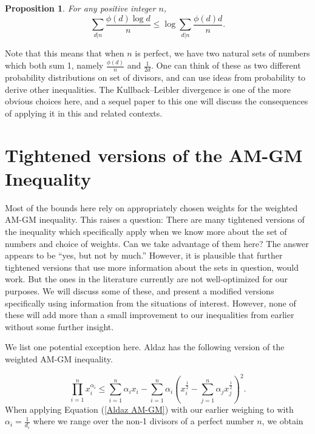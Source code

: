 \documentclass{article}
\newtheorem{proposition}[theorem]{Proposition}
\begin{document}
\begin{proposition} For any positive integer $n$, $$\sum_{d|n} \frac{\phi(d) \log d}{n} \leq \log \sum_{d|n} \frac{\phi(d)d}{n}.$$
\end{proposition}

Note that this means that when $n$ is perfect, we have two natural sets of numbers which both sum 1, namely $\frac{\phi(d)}{n}$ and $\frac{1}{2d}$. One can think of these as two different probability distributions on set of divisors, and can use ideas from probability to derive other inequalities. The Kullback–Leibler divergence is one of the more obvious choices here, and a sequel paper to this one will discuss the consequences of applying it in this and related contexts.


\section{Tightened versions of the AM-GM Inequality}

Most of the bounds here rely  on appropriately chosen weights for the weighted AM-GM inequality. This raises a question: There are many tightened versions of the inequality which specifically apply when we know more about the set of numbers and choice of weights. Can we take advantage of them here? The answer appears to be ``yes, but not by much.'' However, it is plausible that further tightened versions that use more information about the sets in question,  would work. But the ones in the literature currently are not well-optimized for our purposes. We will discuss some of these, and present a modified versions specifically using information from the situations of interest. However,  none of these will add more than a small improvement to our inequalities from earlier without some further insight.



We list one potential exception here. Aldaz \cite{Aldaz} has the following version of the weighted AM-GM inequality.

\begin{equation} \label{Aldaz AM-GM}
\prod_{i=1}^n x_i^{\alpha_i} \leq \sum_{i=1}^n{\alpha_i x_i} - \sum_{i=1}^n \alpha_i\left(x_i^{\frac{1}{2}} - \sum_{j=1}^n \alpha_j x_j^{\frac{1}{2}} \right)^2.
\end{equation}
When applying Equation (\ref{Aldaz AM-GM}) with our earlier weighing to with $\alpha_i = \frac{1}{d_i}$ where we range over the non-1 divisors of a perfect number $n$, we obtain
\end{document}
